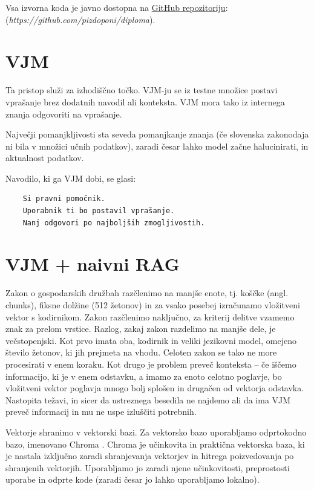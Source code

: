 \documentclass[a4paper,12pt,openright]{book}
\begin{document}
Vsa izvorna koda je javno dostopna na \href{https://github.com/pizdoponi/diploma}{GitHub repozitoriju}: \\(\textit{https://github.com/pizdoponi/diploma}).

\section{VJM}

Ta pristop služi za izhodiščno točko. VJM-ju se iz testne množice postavi vprašanje brez dodatnih navodil ali konteksta. VJM mora tako iz internega znanja odgovoriti na vprašanje.

Največji pomanjkljivosti sta seveda pomanjkanje znanja (če slovenska zakonodaja ni bila v množici učnih podatkov), zaradi česar lahko model začne halucinirati, in aktualnost podatkov.

Navodilo, ki ga VJM dobi, se glasi:

\begin{verbatim}
    Si pravni pomočnik.
    Uporabnik ti bo postavil vprašanje.
    Nanj odgovori po najboljših zmogljivostih.
\end{verbatim}

\section{VJM + naivni RAG}

Zakon o gospodarskih družbah razčlenimo na manjše enote, tj. koščke (angl. chunks), fiksne dolžine (512 žetonov) in za vsako posebej izračunamo vložitveni vektor s kodirnikom. Zakon razčlenimo naključno, za kriterij delitve vzamemo znak za prelom vrstice. Razlog, zakaj zakon razdelimo na manjše dele, je večstopenjski. Kot prvo imata oba, kodirnik in veliki jezikovni model, omejeno število žetonov, ki jih prejmeta na vhodu. Celoten zakon se tako ne more procesirati v enem koraku. Kot drugo je problem preveč konteksta – če iščemo informacijo, ki je v enem odstavku, a imamo za enoto celotno poglavje, bo vložitveni vektor poglavja mnogo bolj splošen in drugačen od vektorja odstavka. Nastopita težavi, in sicer da ustreznega besedila ne najdemo ali da ima VJM preveč informacij in mu ne uspe izluščiti potrebnih.

Vektorje shranimo v vektorski bazi. Za vektorsko bazo uporabljamo odprtokodno bazo, imenovano Chroma \cite{chroma}. Chroma je učinkovita in praktična vektorska baza, ki je nastala izključno zaradi shranjevanja vektorjev in hitrega poizvedovanja po shranjenih vektorjih. Uporabljamo jo zaradi njene učinkovitosti, preprostosti uporabe in odprte kode (zaradi česar jo lahko uporabljamo lokalno).
\end{document}
